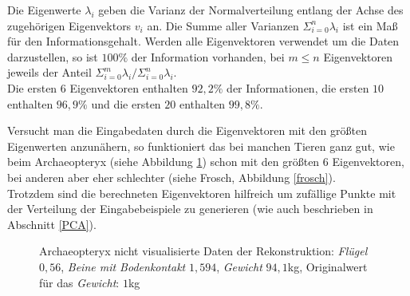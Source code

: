  Die Eigenwerte $\lambda_i$ geben die Varianz der Normalverteilung entlang der Achse des zugehörigen Eigenvektors $v_i$ an. Die Summe aller Varianzen $\Sigma_{i=0}^n \lambda_i$ ist ein Maß für den Informationsgehalt. Werden alle Eigenvektoren verwendet um die Daten darzustellen, so ist $100\%$ der Information vorhanden, bei $m \le n$ Eigenvektoren jeweils der Anteil $\Sigma_{i=0}^m \lambda_i / \Sigma_{i=0}^n \lambda_i$.\\
 Die ersten $6$ Eigenvektoren enthalten $92{,}2\%$ der Informationen, die ersten $10$ enthalten $96{,}9\%$ und die ersten $20$ enthalten $99{,}8\%$.
 
 \newpage
 Versucht man die Eingabedaten durch die Eigenvektoren mit den größten Eigenwerten anzunähern, so funktioniert das bei manchen Tieren ganz gut, wie \zb beim \mbox{Archaeopteryx} (siehe Abbildung \ref{archaeopteryx}) schon mit den größten $6$ Eigenvektoren, bei anderen aber eher schlechter (siehe Frosch, Abbildung \ref{frosch}).\\
 Trotzdem sind die berechneten Eigenvektoren hilfreich um zufällige Punkte mit der Verteilung der Eingabebeispiele zu generieren (wie auch beschrieben in Abschnitt \ref{PCA}).
 
 \begin{figure}
  \centering
  \qquad
  
  \caption{Archaeopteryx nicht visualisierte Daten der Rekonstruktion: \emph{Flügel} $0{,}56$, \emph{Beine mit Bodenkontakt} $1{,}594$, \emph{Gewicht} $94{,}1$kg, Originalwert für das \emph{Gewicht}: $1$kg}
  \label{archaeopteryx}
 \end{figure}
 
